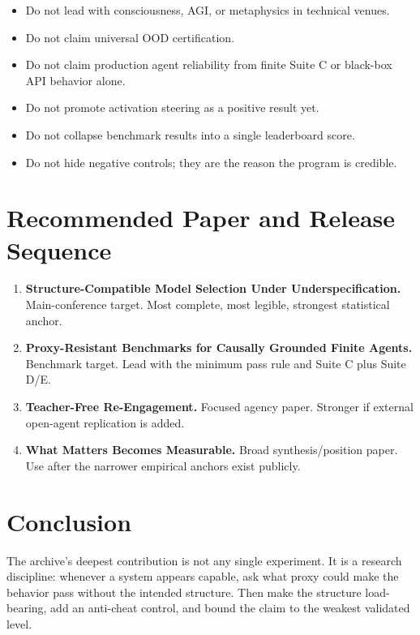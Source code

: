\documentclass[11pt]{article}
\begin{document}
\begin{itemize}
  \item Do not lead with consciousness, AGI, or metaphysics in technical
  venues.
  \item Do not claim universal OOD certification.
  \item Do not claim production agent reliability from finite Suite C or
  black-box API behavior alone.
  \item Do not promote activation steering as a positive result yet.
  \item Do not collapse benchmark results into a single leaderboard score.
  \item Do not hide negative controls; they are the reason the program is
  credible.
\end{itemize}

\section{Recommended Paper and Release Sequence}

\begin{enumerate}
  \item \textbf{Structure-Compatible Model Selection Under Underspecification.}
  Main-conference target. Most complete, most legible, strongest statistical
  anchor.
  \item \textbf{Proxy-Resistant Benchmarks for Causally Grounded Finite
  Agents.} Benchmark target. Lead with the minimum pass rule and Suite C plus
  Suite D/E.
  \item \textbf{Teacher-Free Re-Engagement.} Focused agency paper. Stronger if
  external open-agent replication is added.
  \item \textbf{What Matters Becomes Measurable.} Broad synthesis/position
  paper. Use after the narrower empirical anchors exist publicly.
\end{enumerate}

\section{Conclusion}

The archive's deepest contribution is not any single experiment. It is a
research discipline: whenever a system appears capable, ask what proxy could
make the behavior pass without the intended structure. Then make the structure
load-bearing, add an anti-cheat control, and bound the claim to the weakest
validated level.
\end{document}
